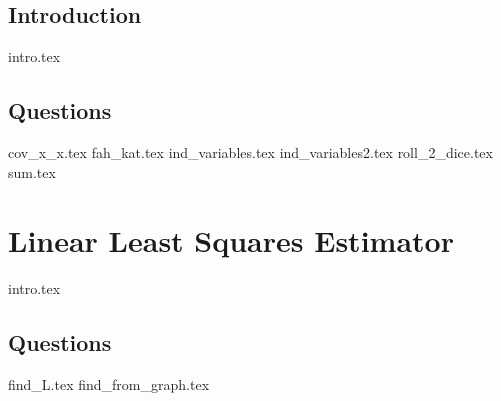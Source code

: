 \documentclass{exam}
\begin{document}
\subsection{Introduction}
{intro.tex}
\subsection{Questions}
\begin{questions}
{cov_x_x.tex}
{fah_kat.tex}
{ind_variables.tex}
{ind_variables2.tex}
{roll_2_dice.tex}
{sum.tex}
\end{questions}

\section{Linear Least Squares Estimator}
{intro.tex}
\subsection{Questions}
\begin{questions}
{find_L.tex}
{find_from_graph.tex}
\end{questions}
\end{document}
